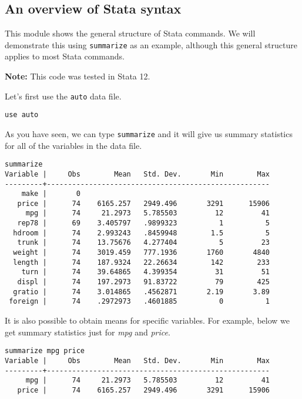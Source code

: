 \subsection{An overview of Stata syntax}

This module shows the general structure of Stata commands. We will demonstrate this using \lstinline{summarize} as an example, although this general structure applies to most Stata commands.

\textbf{Note:} This code was tested in Stata 12.

Let's first use the \lstinline{auto} data file.

\begin{lstlisting}
use auto
\end{lstlisting}

As you have seen, we can type \lstinline{summarize} and it will give us summary statistics for all of the variables in the data file.

\begin{lstlisting}
summarize
Variable |     Obs        Mean   Std. Dev.       Min        Max
---------+-----------------------------------------------------
    make |       0
   price |      74    6165.257   2949.496       3291      15906
     mpg |      74     21.2973   5.785503         12         41
   rep78 |      69    3.405797   .9899323          1          5
  hdroom |      74    2.993243   .8459948        1.5          5
   trunk |      74    13.75676   4.277404          5         23
  weight |      74    3019.459   777.1936       1760       4840
  length |      74    187.9324   22.26634        142        233
    turn |      74    39.64865   4.399354         31         51
   displ |      74    197.2973   91.83722         79        425
  gratio |      74    3.014865   .4562871       2.19       3.89
 foreign |      74    .2972973   .4601885          0          1
\end{lstlisting}

It is also possible to obtain means for specific variables. For example, below we get summary statistics just for \textit{mpg} and \textit{price}.

\begin{lstlisting}
summarize mpg price
Variable |     Obs        Mean   Std. Dev.       Min        Max
---------+-----------------------------------------------------
     mpg |      74     21.2973   5.785503         12         41
   price |      74    6165.257   2949.496       3291      15906
\end{lstlisting}

